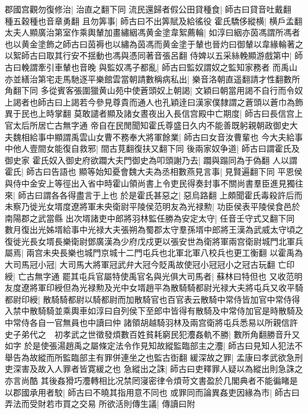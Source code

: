 郡國宫觀勿復修治|{
	治直之翻下同}
流民還歸者假公田貸種食|{
	師古曰貸音吐戴翻　種五穀種也音章勇翻}
且勿筭事|{
	師古曰不出筭賦及給徭役}
霍氏驕侈縱横|{
	横戶孟翻}
太夫人顯廣治第室作乘輿輦加畫繡絪馮黄金塗韋絮薦輪|{
	如淳曰絪亦茵馮謂所馮者也以黄金塗飾之師古曰茵褥也以繡為茵馮而黄金塗于輦也晉灼曰御輦以韋緣輪著之以絮師古曰取其行安不揺動也馮與憑同著音張呂翻}
侍婢以五采絲輓顯游戲第中|{
	師古曰輓謂牽引車輦也音晚}
與監奴馮子都亂|{
	師古曰監奴謂奴之監知家務者}
而禹山亦並繕治第宅走馬馳逐平樂館雲當朝請數稱病私出|{
	樂音洛朝直遥翻請才性翻數所角翻下同}
多從賓客張圍獵黄山苑中使蒼頭奴上朝謁|{
	文穎曰朝當用謁不自行而令奴上謁者也師古曰上謁若今參見尊貴而通人也孔穎逹曰漢家僕隸謂之蒼頭以蒼巾為飾異于民也上時掌翻}
莫敢譴者顯及諸女晝夜出入長信宫殿中亡期度|{
	師古曰長信宫上官太后所居亡古無字通}
帝自在民閒聞知霍氏尊盛日久内不能善既躬親朝政御史大夫魏相給事中顯謂禹雲山女曹不務奉大將軍餘業|{
	師古曰女音汝曹輩也}
今大夫給事中他人壹間女能復自救邪|{
	間古莧翻復扶又翻下同}
後兩家奴争道|{
	師古曰謂霍氏及御史家}
霍氏奴入御史府欲躢大夫門御史為叩頭謝乃去|{
	躢與蹋同為于偽翻}
人以謂霍氏|{
	師古曰告語也}
顯等始知憂會魏大夫為丞相數燕見言事|{
	見賢遍翻下同}
平恩侯與侍中金安上等徑出入省中時霍山領尚書上令吏民得奏封事不關尚書羣臣進見獨往來|{
	師古曰謂各各得盡言于上也}
於是霍氏甚惡之|{
	惡烏路翻}
上頗聞霍氏毒殺許后而未察乃徙光女壻度遼將軍未央衛尉平陵侯范明友為光禄勲|{
	功臣侯表平陵侯食邑於南陽郡之武當縣}
出次壻諸吏中郎將羽林監任勝為安定太守|{
	任音壬守式又翻下同}
數月復出光姊壻給事中光禄大夫張朔為蜀郡太守羣孫壻中郎將王漢為武威太守頃之復徙光長女壻長樂衛尉鄧廣漢為少府戊戍更以張安世為衛將軍兩宫衛尉城門北軍兵屬焉|{
	兩宫未央長樂也城門京城十二門屯兵也北軍北軍八校兵也更工衡翻}
以霍禹為大司馬冠小冠|{
	大司馬大將軍冠武弁大冠今貶禹故使冠小冠冠小之冠古玩翻}
亡印綬|{
	亡古無字通}
罷其屯兵官屬特使禹官名與光俱大司馬者|{
	蘇林曰特但也}
又收范明友度遼將軍印綬但為光禄勲及光中女壻趙平為散騎騎都尉光禄大夫將屯兵又收平騎都尉印綬|{
	散騎騎都尉以騎都尉而加散騎官也百官表云散騎中常侍皆加官中常侍得入禁中散騎騎並乘輿車如淳曰自列侯下至郎中皆得有散騎及中常侍加官是時散騎及中常侍各自一官無員也中讀曰仲}
諸領胡越騎羽林及兩宫衛將屯兵悉易以所親信許史子弟代之　初孝武之世徵發煩數百姓貧耗窮民犯灋姦軌不勝|{
	數所角翻勝音升又如字}
於是使張湯趙禹之屬條定法令作見知故縱監臨部主之灋|{
	師古曰見知人犯法不舉告為故縱而所監臨部主有罪併連坐之也監古衘翻}
緩深故之罪|{
	孟康曰孝武欲急刑吏深害及故入人罪者皆寛緩之也}
急縱出之誅|{
	師古曰吏釋罪人疑以為縱出則急誅之亦言尚酷}
其後姦猾巧灋轉相比况禁罔寖密律令煩苛文書盈於几閣典者不能徧睹是以郡國承用者駮|{
	師古曰不曉其指用意不同也}
或罪同而論異姦吏因緣為市|{
	師古曰弄法而受財若市買之交易}
所欲活則傳生議|{
	傳讀曰附}
